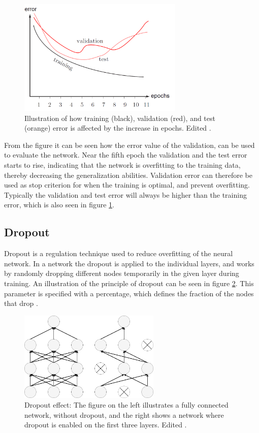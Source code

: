 \begin{figure} [H]
\centering
\includegraphics[width=0.7\textwidth]{figures/learningCurves}
\caption{Illustration of how training (black), validation (red), and test (orange) error is affected by the increase in epochs. Edited \citep{Duda2000}.}
\label{fig:learningCurve}
\end{figure}

\noindent
From the figure it can be seen how the error value of the validation, can be used to evaluate the network. 
Near the fifth epoch the validation and the test error starts to rise, indicating that the network is overfitting to the training data, thereby decreasing the generalization abilities. 
Validation error can therefore be used as stop criterion for when the training is optimal, and prevent overfitting. 
Typically the validation and test error will always be higher than the training error, which is also seen in figure \ref{fig:learningCurve}.\citep{Duda2000}

\subsection{Dropout}\label{sec:dropout}
Dropout is a regulation technique used to reduce overfitting of the neural network. In a network the dropout is applied to the individual layers, and works by randomly dropping different nodes temporarily in the given layer during training. An illustration of the principle of dropout can be seen in figure \ref{fig:Dropout}. This parameter is specified with a percentage, which defines the fraction of the nodes that drop \citep{Chollet2015}.

\begin{figure} [H]
\centering
\includegraphics[width=0.6\textwidth]{figures/Dropout}
\caption{Dropout effect: The figure on the left illustrates a fully connected network, without dropout, and the right shows a network where dropout is enabled on the first three layers. Edited \citep{Srivastava2014}.}
\label{fig:Dropout} 
\end{figure}


